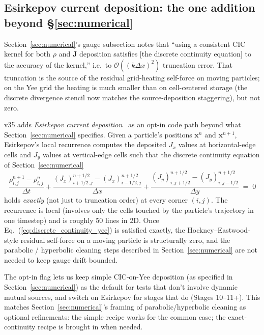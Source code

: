 \documentclass[11pt,a4paper]{article}
\newcommand{\vv}[1]{\mathbf{#1}}
\begin{document}
\subsection{Esirkepov current deposition: the one addition beyond §\ref{sec:numerical}}

Section~\ref{sec:numerical}'s gauge subsection notes that ``using a
consistent CIC kernel for both $\rho$ and $\vv{J}$ deposition
satisfies [the discrete continuity equation] to the accuracy of the
kernel,'' i.e.\ to $\mathcal{O}((k\Delta x)^2)$ truncation error.  That
truncation is the source of the residual grid-heating self-force on
moving particles; on the Yee grid the heating is much smaller than on
cell-centered storage (the discrete divergence stencil now matches
the source-deposition staggering), but not zero.

v35 adds \emph{Esirkepov current deposition}~\cite{Esirkepov2001} as
an opt-in code path beyond what Section~\ref{sec:numerical}
specifies.  Given a particle's positions $\vv{x}^n$ and
$\vv{x}^{n+1}$, Esirkepov's local recurrence computes the deposited
$J_x$ values at horizontal-edge cells and $J_y$ values at
vertical-edge cells such that the discrete continuity equation of
Section~\ref{sec:numerical}
\begin{equation}
\label{eq:discrete_continuity_yee}
  \frac{\rho^{n+1}_{i,j} - \rho^n_{i,j}}{\Delta t}
  + \frac{(J_x)^{n+1/2}_{i+1/2,j} - (J_x)^{n+1/2}_{i-1/2,j}}{\Delta x}
  + \frac{(J_y)^{n+1/2}_{i,j+1/2} - (J_y)^{n+1/2}_{i,j-1/2}}{\Delta y}
  \;=\; 0
\end{equation}
holds \emph{exactly} (not just to truncation order) at every corner
$(i,j)$.  The recurrence is local (involves only the cells touched by
the particle's trajectory in one timestep) and is roughly 50 lines in
2D.  Once Eq.~(\ref{eq:discrete_continuity_yee}) is satisfied exactly,
the Hockney--Eastwood-style residual self-force on a moving particle
is structurally zero, and the parabolic / hyperbolic cleaning steps
described in Section~\ref{sec:numerical} are not needed to keep gauge
drift bounded.

The opt-in flag lets us keep simple CIC-on-Yee deposition (as
specified in Section~\ref{sec:numerical}) as the default for tests
that don't involve dynamic mutual sources, and switch on Esirkepov
for stages that do (Stages 10--11+).  This matches
Section~\ref{sec:numerical}'s framing of parabolic/hyperbolic cleaning
as optional refinements: the simple recipe works for the common case;
the exact-continuity recipe is brought in when needed.
\end{document}
